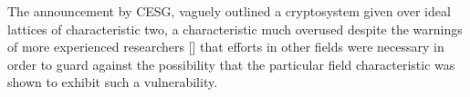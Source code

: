 The announcement by CESG, vaguely outlined a cryptosystem given over ideal lattices of characteristic two, a characteristic much overused despite the warnings of more experienced researchers [\cite{Cra20151}] that efforts in other fields were necessary in order to guard against the possibility that the particular field characteristic was shown to exhibit such a vulnerability. 



